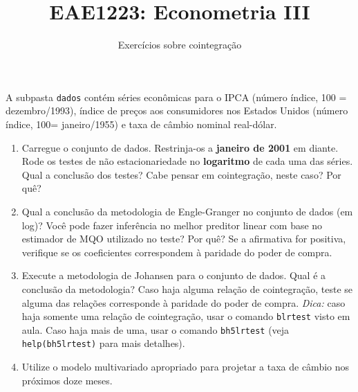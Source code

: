 \documentclass[10pt,a4paper]{article}
\title{\large EAE1223: Econometria III}
\author{\normalsize Exercícios sobre cointegração}
\date{}
\begin{document}
	\maketitle
	
	A subpasta \texttt{dados} contém séries econômicas para o IPCA (número índice, 100 = dezembro/1993), índice de preços aos consumidores nos Estados Unidos (número índice, 100= janeiro/1955) e taxa de câmbio nominal real-dólar.
	
	
	\begin{enumerate}
		\item Carregue o conjunto de dados. Restrinja-os a \textbf{janeiro de 2001} em diante. Rode os testes de não estacionariedade no \textbf{logaritmo} de cada uma das séries. Qual a conclusão dos testes? Cabe pensar em cointegração, neste caso? Por quê?
		
		\item Qual a conclusão da metodologia de Engle-Granger no conjunto de dados (em log)? Você pode fazer inferência no melhor preditor linear com base no estimador de MQO utilizado no teste? Por quê? Se a afirmativa for positiva, verifique se os coeficientes correspondem à paridade do poder de compra.
		
		\item Execute a metodologia de Johansen para o conjunto de dados. Qual é a conclusão da metodologia? Caso haja alguma relação de cointegração, teste se alguma das relações corresponde à paridade do poder de compra. \textit{Dica:} caso haja somente uma relação de cointegração, usar o comando \texttt{blrtest} visto em aula. Caso haja mais de uma, usar o comando \texttt{bh5lrtest} (veja \texttt{help(bh5lrtest)} para mais detalhes).
		
		\item Utilize o modelo multivariado apropriado para projetar a taxa de câmbio nos próximos doze meses.
\end{enumerate}
\end{document}
